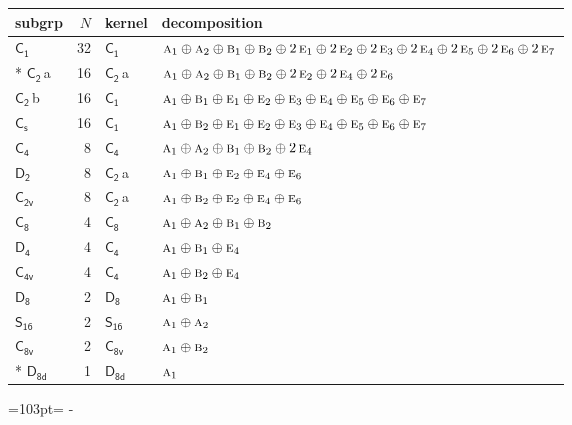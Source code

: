\documentclass[10pt,a4paper]{article}
\newcommand{\needspace}[1]{\par\penalty-100\begingroup\dimen0=#1\relax\dimen2=\pagegoal
  \advance\dimen2-\pagetotal\ifdim\dimen0>\dimen2\relax\ifdim\dimen2>0pt\vfil\break\fi\fi
  \endgroup}
\numberwithin{equation}{section}
\newcommand{\grp}[1]{\mathsf{#1}}
\newcommand{\irr}[1]{\text{\normalfont\scshape #1}}
\newcommand{\clsletter}[1]{\,{\scriptsize\color{black!55}#1}}
\newlength{\fillwidth}\newlength{\cellwidth}\newlength{\colwidth}
\begin{document}
{\begin{longtable}{@{}lrl>{\RaggedRight\arraybackslash}p{\fillwidth}@{}}
subgrp & $N$ & kernel & decomposition\\\midrule\endhead
\bottomrule\endfoot\endlastfoot
\href{C1.pdf}{$\grp{C_{1}}$} & 32 & \href{C1.pdf}{$\grp{C_{1}}$} & $\irr{a}_{1}\oplus \irr{a}_{2}\oplus \irr{b}_{1}\oplus \irr{b}_{2}\oplus 2\,\irr{e}_{1}\oplus 2\,\irr{e}_{2}\oplus 2\,\irr{e}_{3}\oplus 2\,\irr{e}_{4}\oplus 2\,\irr{e}_{5}\oplus 2\,\irr{e}_{6}\oplus 2\,\irr{e}_{7}$\\*
\href{C2.pdf}{$\grp{C_{2}}$}\clsletter{a} & 16 & \href{C2.pdf}{$\grp{C_{2}}$}\clsletter{a} & $\irr{a}_{1}\oplus \irr{a}_{2}\oplus \irr{b}_{1}\oplus \irr{b}_{2}\oplus 2\,\irr{e}_{2}\oplus 2\,\irr{e}_{4}\oplus 2\,\irr{e}_{6}$\\
\href{C2.pdf}{$\grp{C_{2}}$}\clsletter{b} & 16 & \href{C1.pdf}{$\grp{C_{1}}$} & $\irr{a}_{1}\oplus \irr{b}_{1}\oplus \irr{e}_{1}\oplus \irr{e}_{2}\oplus \irr{e}_{3}\oplus \irr{e}_{4}\oplus \irr{e}_{5}\oplus \irr{e}_{6}\oplus \irr{e}_{7}$\\
\href{C1v.pdf}{$\grp{C_{s}}$} & 16 & \href{C1.pdf}{$\grp{C_{1}}$} & $\irr{a}_{1}\oplus \irr{b}_{2}\oplus \irr{e}_{1}\oplus \irr{e}_{2}\oplus \irr{e}_{3}\oplus \irr{e}_{4}\oplus \irr{e}_{5}\oplus \irr{e}_{6}\oplus \irr{e}_{7}$\\
\href{C4.pdf}{$\grp{C_{4}}$} & 8 & \href{C4.pdf}{$\grp{C_{4}}$} & $\irr{a}_{1}\oplus \irr{a}_{2}\oplus \irr{b}_{1}\oplus \irr{b}_{2}\oplus 2\,\irr{e}_{4}$\\
\href{D2.pdf}{$\grp{D_{2}}$} & 8 & \href{C2.pdf}{$\grp{C_{2}}$}\clsletter{a} & $\irr{a}_{1}\oplus \irr{b}_{1}\oplus \irr{e}_{2}\oplus \irr{e}_{4}\oplus \irr{e}_{6}$\\
\href{C2v.pdf}{$\grp{C_{2v}}$} & 8 & \href{C2.pdf}{$\grp{C_{2}}$}\clsletter{a} & $\irr{a}_{1}\oplus \irr{b}_{2}\oplus \irr{e}_{2}\oplus \irr{e}_{4}\oplus \irr{e}_{6}$\\
\href{C8.pdf}{$\grp{C_{8}}$} & 4 & \href{C8.pdf}{$\grp{C_{8}}$} & $\irr{a}_{1}\oplus \irr{a}_{2}\oplus \irr{b}_{1}\oplus \irr{b}_{2}$\\
\href{D4.pdf}{$\grp{D_{4}}$} & 4 & \href{C4.pdf}{$\grp{C_{4}}$} & $\irr{a}_{1}\oplus \irr{b}_{1}\oplus \irr{e}_{4}$\\
\href{C4v.pdf}{$\grp{C_{4v}}$} & 4 & \href{C4.pdf}{$\grp{C_{4}}$} & $\irr{a}_{1}\oplus \irr{b}_{2}\oplus \irr{e}_{4}$\\
\href{D8.pdf}{$\grp{D_{8}}$} & 2 & \href{D8.pdf}{$\grp{D_{8}}$} & $\irr{a}_{1}\oplus \irr{b}_{1}$\\
\href{S16.pdf}{$\grp{S_{16}}$} & 2 & \href{S16.pdf}{$\grp{S_{16}}$} & $\irr{a}_{1}\oplus \irr{a}_{2}$\\
\href{C8v.pdf}{$\grp{C_{8v}}$} & 2 & \href{C8v.pdf}{$\grp{C_{8v}}$} & $\irr{a}_{1}\oplus \irr{b}_{2}$\\*
\href{D8d.pdf}{$\grp{D_{8d}}$} & 1 & \href{D8d.pdf}{$\grp{D_{8d}}$} & $\irr{a}_{1}$\\
\bottomrule\end{longtable}}
\needspace{103pt}
\end{document}
